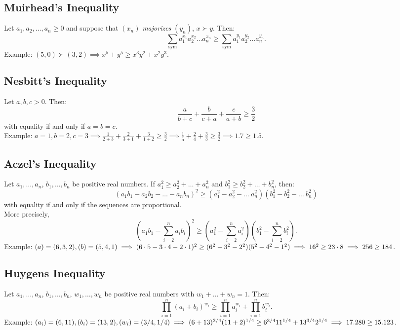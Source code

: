 \documentclass[a4paper,11pt]{article}
\begin{document}
\subsection{Muirhead's Inequality}
\begin{tcolorbox}[breakable]
    Let $a_1,a_2,\dots,a_n\geq0$ and suppose that $(x_n)$ \emph{majorizes} $(y_n)$, $x\succ y$. Then:
    \[
    \sum_{\text{sym}} a_1^{x_1}a_2^{x_2}\dots a_n^{x_n} \geq \sum_{\text{sym}} a_1^{y_1}a_2^{y_2}\dots a_n^{y_n}.
    \]
    Example: $\textstyle (5,0) \succ (3,2) \implies x^5+y^5 \geq x^3y^2+x^2y^3$.
\end{tcolorbox}


\subsection{Nesbitt's Inequality}
\begin{tcolorbox}[breakable]
    Let $a,b,c>0$. Then:
    \[
    \frac{a}{b+c} + \frac{b}{c+a} + \frac{c}{a+b} \geq \frac{3}{2}
    \]
    with equality if and only if $a=b=c$. \\[6pt]
    Example: $\textstyle a=1,b=2,c=3 \implies \frac{1}{2+3} + \frac{2}{3+1} + \frac{3}{1+2} \geq \frac{3}{2} \implies \frac{1}{5} + \frac{2}{4} + \frac{3}{3} \geq \frac{3}{2} \implies1.7 \geq 1.5$.
\end{tcolorbox}


\subsection{Aczel's Inequality}
\begin{tcolorbox}[breakable]
    Let $a_1,\dots,a_n$, $b_1,\dots,b_n$ be positive real numbers. If $a_1^2\geq a_2^2+\dots+a_n^2$ and $b_1^2\geq b_2^2+\dots+b_n^2$, then:
    \[
    (a_1b_1 - a_2b_2 - \dots - a_nb_n)^2 \geq (a_1^2 - a_2^2 - \dots \ a_n^2)(b_1^2 - b_2^2 - \dots \ b_n^2)
    \]
    with equality if and only if the sequences are proportional. \\[6pt]
    More precisely,
    \[
    \left( a_1b_1 - \sum_{i=2}^n a_ib_i \right)^2 \geq \left( a_1^2 - \sum_{i=2}^n a_i^2 \right) \left( b_1^2 - \sum_{i=2}^n b_i^2 \right).
    \]
    Example: $(a)=(6,3,2), (b)=(5,4,1) \\[6pt]
    \implies (6\cdot5 - 3\cdot4 - 2\cdot 1)^2 \geq (6^2-3^2-2^2)(5^2-4^2-1^2) \implies 16^2 \geq 23\cdot8 \implies 256\geq184$.
\end{tcolorbox}


\subsection{Huygens Inequality}
\begin{tcolorbox}[breakable]
    Let $a_1,\dots,a_n$, $b_1,\dots,b_n$, $w_1,\dots,w_n$ be positive real numbers with $w_1+\dots+w_n=1$. Then:
    \[
    \prod_{i=1}^n (a_i+b_i)^{w_i} \geq \prod_{i=1}^n a_i^{w_i} + \prod_{i=1}^n b_i^{w_i}.
    \]
    Example: $\textstyle (a_i)=(6,11), (b_i)=(13,2), (w_i)=(3/4, 1/4) \\[6pt]
    \implies (6+13)^{3/4}(11+2)^{1/4} \geq 6^{3/4}11^{1/4} + 13^{3/4}2^{1/4} \implies 17.280\geq15.123$.
\end{tcolorbox}
\end{document}
